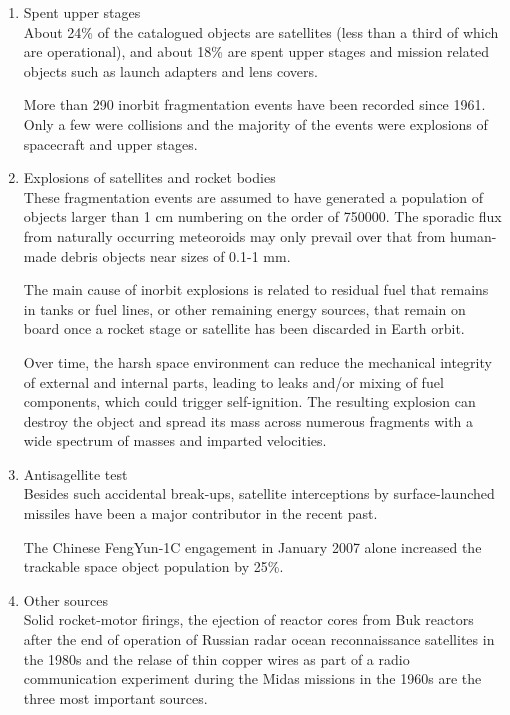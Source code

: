 \begin{enumerate}
\item{Spent upper stages}\\
About 24\% of the catalogued objects are satellites (less than a third of which are operational), and about 18\% are spent upper stages and mission related objects such as launch adapters and lens covers.

More than 290 inorbit fragmentation events have been recorded since 1961. Only a few were collisions and the majority of the events were explosions of spacecraft and upper stages.

\item{Explosions of satellites and rocket bodies}\\
These fragmentation events are assumed to have generated a population of objects larger than 1 cm numbering on the order of 750000. The sporadic flux from naturally occurring meteoroids may only prevail over that from human-made debris objects near sizes of 0.1-1 mm.

The main cause of inorbit explosions is related to residual fuel that remains in tanks or fuel lines, or other remaining energy sources, that remain on board once a rocket stage or satellite has been discarded in Earth orbit.

Over time, the harsh space environment can reduce the mechanical integrity of external and internal parts, leading to leaks and/or mixing of fuel components, which could trigger self-ignition. The resulting explosion can destroy the object and spread its mass across numerous fragments with a wide spectrum of masses and imparted velocities.

\item{Antisagellite test}\\
Besides such accidental break-ups, satellite interceptions by surface-launched missiles have been a major contributor in the recent past.

The Chinese FengYun-1C engagement in January 2007 alone increased the trackable space object population by 25\%.
\item{Other sources}\\
Solid rocket-motor firings, the ejection of reactor cores from Buk reactors after the end of operation of Russian radar ocean reconnaissance satellites in the 1980s and the relase of thin copper wires as part of a radio communication experiment during the Midas missions in the 1960s are the three most important sources.
\end{enumerate}

